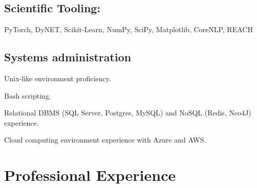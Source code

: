 \documentclass[letterpaper]{article}
\renewenvironment{itemize}{
  \begin{list}{}{
    \setlength{\leftmargin}{1.5em}
  }
}{
  \end{list}
}
\begin{document}
\subsection*{Scientific Tooling:}
\begin{itemize}
	\item PyTorch, DyNET, Scikit-Learn, NumPy, SciPy, Matplotlib, CoreNLP, REACH
\end{itemize}


\subsection*{Systems administration}
\begin{itemize}
	\item Unix-like environment proficiency.
	\item Bash scripting.
	\item Relational DBMS (SQL Server, Postgres, MySQL) and NoSQL (Redis, Neo4J) experience.
	\item Cloud computing environment experience with Azure and AWS.
\end{itemize}


\section*{Professional Experience}
\end{document}
